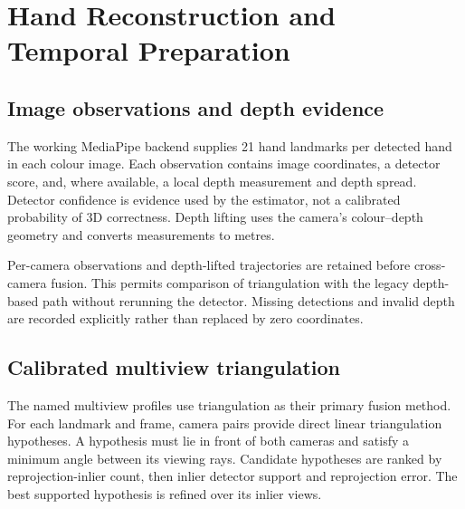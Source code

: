 \section{Hand Reconstruction and Temporal Preparation}
\label{sec:fusion}

\subsection{Image observations and depth evidence}

The working MediaPipe backend supplies 21 hand landmarks per detected hand
in each colour image. Each observation contains image coordinates, a
detector score, and, where available, a local depth measurement and depth
spread. Detector confidence is evidence used by the estimator, not a
calibrated probability of 3D correctness. Depth lifting uses the camera's
colour--depth geometry and converts measurements to metres.

Per-camera observations and depth-lifted trajectories are retained before
cross-camera fusion. This permits comparison of triangulation with the
legacy depth-based path without rerunning the detector. Missing detections
and invalid depth are recorded explicitly rather than replaced by zero
coordinates.

\subsection{Calibrated multiview triangulation}

The named multiview profiles use triangulation as their primary fusion
method. For each landmark and frame, camera pairs provide direct linear
triangulation hypotheses. A hypothesis must lie in front of both cameras
and satisfy a minimum angle between its viewing rays. Candidate hypotheses
are ranked by reprojection-inlier count, then inlier detector support and
reprojection error. The best supported hypothesis is refined over its
inlier views.

